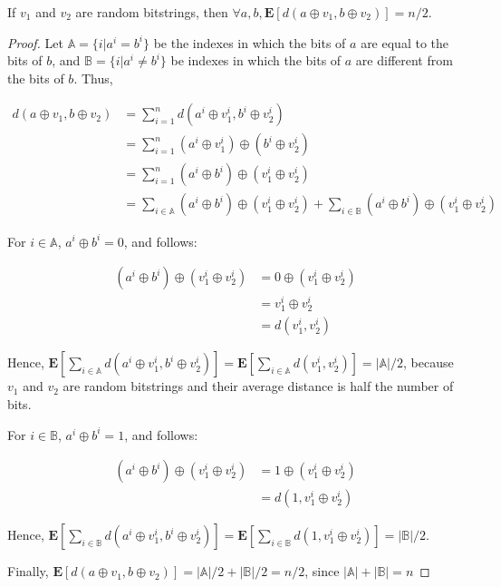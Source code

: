 \begin{theorem}
If $v_1$ and $v_2$ are random bitstrings, then $\forall a, b, \mathbf{E} \left[ d(a \oplus v_1, b \oplus v_2) \right] = n/2$.
\label{thm:xor-chuncks}
\end{theorem}
\begin{proof}
Let $\mathbb{A} = \{ i | a^i = b^i \}$ be the indexes in which the bits of $a$ are equal to the bits of $b$, and $\mathbb{B} = \{ i | a^i \ne b^i \}$ be indexes in which the bits of $a$ are different from the bits of $b$. Thus,

\begin{align*}
d(a \oplus v_1, b \oplus v_2) &= \sum_{i=1}^n d(a^i \oplus v_1^i, b^i \oplus v_2^i) \\
    &= \sum_{i=1}^n (a^i \oplus v_1^i) \oplus (b^i \oplus v_2^i) \\
    &= \sum_{i=1}^n (a^i \oplus b^i) \oplus (v_1^i \oplus v_2^i) \\
    &= \sum_{i \in \mathbb{A}} (a^i \oplus b^i) \oplus (v_1^i \oplus v_2^i) +
       \sum_{i \in \mathbb{B}} (a^i \oplus b^i) \oplus (v_1^i \oplus v_2^i)
\end{align*}

For $i \in \mathbb{A}$, $a^i \oplus b^i = 0$, and follows:

\begin{align*}
(a^i \oplus b^i) \oplus (v_1^i \oplus v_2^i) &= 0 \oplus (v_1^i \oplus v_2^i) \\
    &= v_1^i \oplus v_2^i \\
    &= d(v_1^i, v_2^i)
\end{align*}

Hence, $\mathbf{E} \left[ \sum_{i \in \mathbb{A}} d(a^i \oplus v_1^i, b^i \oplus v_2^i) \right] = \mathbf{E} \left[ \sum_{i \in \mathbb{A}} d(v_1^i, v_2^i) \right] = |\mathbb{A}|/2$, because $v_1$ and $v_2$ are random bitstrings and their average distance is half the number of bits.

For $i \in \mathbb{B}$, $a^i \oplus b^i = 1$, and follows:

\begin{align*}
(a^i \oplus b^i) \oplus (v_1^i \oplus v_2^i) &= 1 \oplus (v_1^i \oplus v_2^i) \\
    &= d(1, v_1^i \oplus v_2^i)
\end{align*}

Hence, $\mathbf{E} \left[ \sum_{i \in \mathbb{B}} d(a^i \oplus v_1^i, b^i \oplus v_2^i) \right] = \mathbf{E} \left[ \sum_{i \in \mathbb{B}} d(1, v_1^i \oplus v_2^i) \right] = |\mathbb{B}|/2$.

Finally, $\mathbf{E} \left[ d(a \oplus v_1, b \oplus v_2) \right] = |\mathbb{A}|/2 + |\mathbb{B}|/2 = n/2$, since $|\mathbb{A}| + |\mathbb{B}| = n$
\end{proof}

